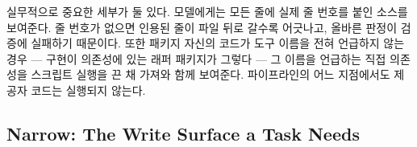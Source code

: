 \documentclass[acmsmall,screen,review,anonymous]{acmart}
\begin{document}
실무적으로 중요한 세부가 둘 있다. 모델에게는 모든 줄에 실제 줄 번호를 붙인 소스를 보여준다. 줄 번호가 없으면 인용된 줄이 파일 뒤로 갈수록 어긋나고, 올바른 판정이 검증에 실패하기 때문이다. 또한 패키지 자신의 코드가 도구 이름을 전혀 언급하지 않는 경우 --- 구현이 의존성에 있는 래퍼 패키지가 그렇다 --- 그 이름을 언급하는 직접 의존성을 스크립트 실행을 끈 채 가져와 함께 보여준다. 파이프라인의 어느 지점에서도 제공자 코드는 실행되지 않는다.

\subsection{Narrow: The Write Surface a Task Needs}
\label{sec:approach:narrow}
\end{document}
